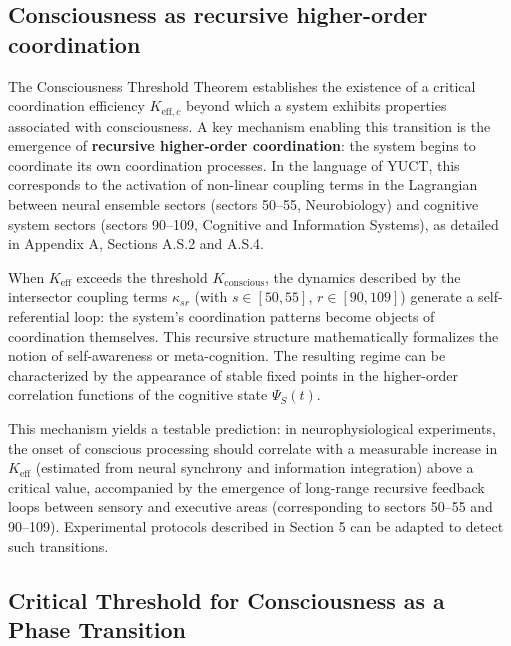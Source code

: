 \documentclass[12pt,a4paper]{article}
\newcommand{\Ke}{K_{\mathrm{eff}}}
\newcommand{\Kec}{K_{\mathrm{eff},c}}
\begin{document}
	\subsection{Consciousness as recursive higher-order coordination}
	\label{subsec:recursive-coordination}
	
	The Consciousness Threshold Theorem establishes the existence of a critical coordination efficiency \(\Kec\) beyond which a system exhibits properties associated with consciousness. A key mechanism enabling this transition is the emergence of \textbf{recursive higher-order coordination}: the system begins to coordinate its own coordination processes. In the language of YUCT, this corresponds to the activation of non-linear coupling terms in the Lagrangian between neural ensemble sectors (sectors 50–55, Neurobiology) and cognitive system sectors (sectors 90–109, Cognitive and Information Systems), as detailed in Appendix A, Sections A.S.2 and A.S.4.
	
	When \(\Ke\) exceeds the threshold \(K_{\mathrm{conscious}}\), the dynamics described by the intersector coupling terms \(\kappa_{sr}\) (with \(s\in[50,55]\), \(r\in[90,109]\)) generate a self-referential loop: the system's coordination patterns become objects of coordination themselves. This recursive structure mathematically formalizes the notion of self-awareness or meta-cognition. The resulting regime can be characterized by the appearance of stable fixed points in the higher-order correlation functions of the cognitive state \(\Psi_S(t)\).
	
	This mechanism yields a testable prediction: in neurophysiological experiments, the onset of conscious processing should correlate with a measurable increase in \(\Ke\) (estimated from neural synchrony and information integration) above a critical value, accompanied by the emergence of long-range recursive feedback loops between sensory and executive areas (corresponding to sectors 50–55 and 90–109). Experimental protocols described in Section 5 can be adapted to detect such transitions.
	
	\subsection{Critical Threshold for Consciousness as a Phase Transition}
	\label{subsec:critical-threshold}
	
\end{document}
